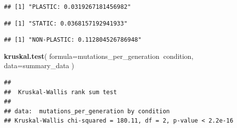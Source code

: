 \documentclass[]{book}
\newenvironment{Shaded}{\begin{snugshade}}{\end{snugshade}}
\newcommand{\DataTypeTok}[1]{\textcolor[rgb]{0.13,0.29,0.53}{#1}}
\newcommand{\KeywordTok}[1]{\textcolor[rgb]{0.13,0.29,0.53}{\textbf{#1}}}
\newcommand{\NormalTok}[1]{#1}
\newcommand{\OperatorTok}[1]{\textcolor[rgb]{0.81,0.36,0.00}{\textbf{#1}}}
\newcommand{\StringTok}[1]{\textcolor[rgb]{0.31,0.60,0.02}{#1}}
\begin{document}
\begin{verbatim}
## [1] "PLASTIC: 0.0319267181456982"
\end{verbatim}

\begin{Shaded}
\end{Shaded}

\begin{verbatim}
## [1] "STATIC: 0.0368157192941933"
\end{verbatim}

\begin{Shaded}
\end{Shaded}

\begin{verbatim}
## [1] "NON-PLASTIC: 0.112804526786948"
\end{verbatim}

\begin{Shaded}
\begin{Highlighting}[]
\KeywordTok{kruskal.test}\NormalTok{(}
  \DataTypeTok{formula=}\NormalTok{mutations_per_generation}\OperatorTok{~}\NormalTok{condition,}
  \DataTypeTok{data=}\NormalTok{summary_data}
\NormalTok{)}
\end{Highlighting}
\end{Shaded}

\begin{verbatim}
## 
##  Kruskal-Wallis rank sum test
## 
## data:  mutations_per_generation by condition
## Kruskal-Wallis chi-squared = 180.11, df = 2, p-value < 2.2e-16
\end{verbatim}

\begin{Shaded}
\end{Shaded}
\end{document}
